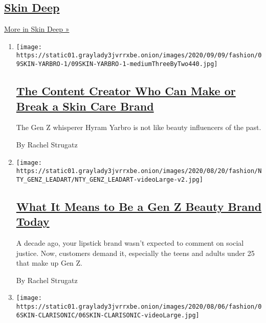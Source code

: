 \hypertarget{skin-deep}{%
\subsection{\texorpdfstring{\href{/column/skin-deep}{Skin
Deep}}{Skin Deep}}\label{skin-deep}}

\href{/column/skin-deep}{More in Skin Deep »}

\begin{enumerate}
\def\labelenumi{\arabic{enumi}.}
\item
  \texttt{[image: https://static01.graylady3jvrrxbe.onion/images/2020/09/09/fashion/09SKIN-YARBRO-1/09SKIN-YARBRO-1-mediumThreeByTwo440.jpg]}

  \hypertarget{the-content-creator-who-can-make-or-break-a-skin-care-brand}{%
  \subsection{\texorpdfstring{\href{/2020/09/08/style/Gen-Z-the-content-creator-who-can-make-or-break-your-skin-care-brand.html}{The
  Content Creator Who Can Make or Break a Skin Care
  Brand}}{The Content Creator Who Can Make or Break a Skin Care Brand}}\label{the-content-creator-who-can-make-or-break-a-skin-care-brand}}

  The Gen Z whisperer Hyram Yarbro is not like beauty influencers of the
  past.

  By Rachel Strugatz
\item
  \texttt{[image: https://static01.graylady3jvrrxbe.onion/images/2020/08/20/fashion/NTY\_GENZ\_LEADART/NTY\_GENZ\_LEADART-videoLarge-v2.jpg]}

  \hypertarget{what-it-means-to-be-a-gen-z-beauty-brand-today}{%
  \subsection{\texorpdfstring{\href{/2020/08/18/style/what-it-means-to-be-a-gen-z-beauty-brand-today.html}{What
  It Means to Be a Gen Z Beauty Brand
  Today}}{What It Means to Be a Gen Z Beauty Brand Today}}\label{what-it-means-to-be-a-gen-z-beauty-brand-today}}

  A decade ago, your lipstick brand wasn't expected to comment on social
  justice. Now, customers demand it, especially the teens and adults
  under 25 that make up Gen Z.

  By Rachel Strugatz
\item
  \texttt{[image: https://static01.graylady3jvrrxbe.onion/images/2020/08/06/fashion/06SKIN-CLARISONIC/06SKIN-CLARISONIC-videoLarge.jpg]}


\end{enumerate}
